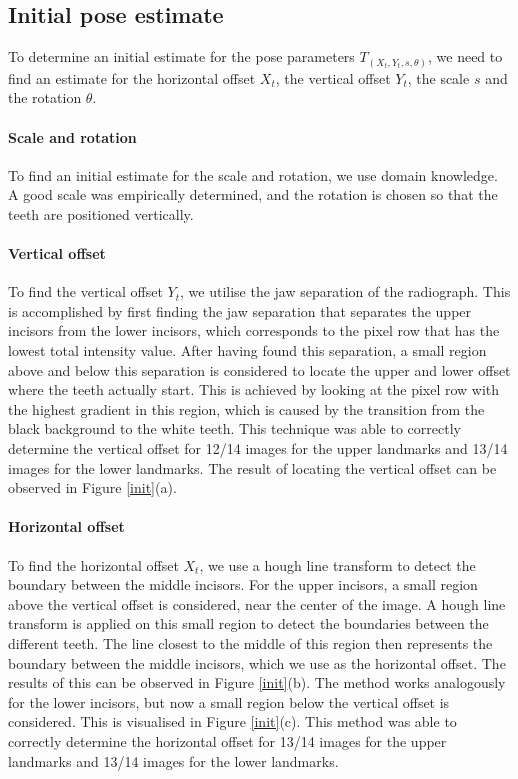 \documentclass[a4paper,titlepage,12pt]{article}
\begin{document}
\subsection{Initial pose estimate}
\label{subsec:initial}

To determine an initial estimate for the pose parameters $T_{(X_t,Y_t,s,\theta)}$, we need to find an estimate for the horizontal offset $X_t$, the vertical offset $Y_t$, the scale $s$ and the rotation $\theta$.

\paragraph{Scale and rotation}

To find an initial estimate for the scale and rotation, we use domain knowledge. A good scale was empirically determined, and the rotation is chosen so that the teeth are positioned vertically.

\paragraph{Vertical offset}

To find the vertical offset $Y_t$, we utilise the jaw separation of the radiograph.
This is accomplished by first finding the jaw separation that separates the upper incisors from the lower incisors, which corresponds to the pixel row that has the lowest total intensity value. After having found this separation, a small region above and below this separation is considered to locate the upper and lower offset where the teeth actually start. This is achieved by looking at the pixel row with the highest gradient in this region, which is caused by the transition from the black background to the white teeth.
This technique was able to correctly determine the vertical offset for 12/14 images for the upper landmarks and 13/14 images for the lower landmarks.
The result of locating the vertical offset can be observed in Figure \ref{init}(a).

\paragraph{Horizontal offset}

To find the horizontal offset $X_t$, we use a hough line transform to detect the boundary between the middle incisors.
For the upper incisors, a small region above the vertical offset is considered, near the center of the image.
A hough line transform is applied on this small region to detect the boundaries between the different teeth.
The line closest to the middle of this region then represents the boundary between the middle incisors, which we use as the horizontal offset.
The results of this can be observed in Figure \ref{init}(b).
The method works analogously for the lower incisors, but now a small region below the vertical offset is considered. 
This is visualised in Figure \ref{init}(c).
This method was able to correctly determine the horizontal offset for 13/14 images for the upper landmarks and 13/14 images for the lower landmarks.
\end{document}
